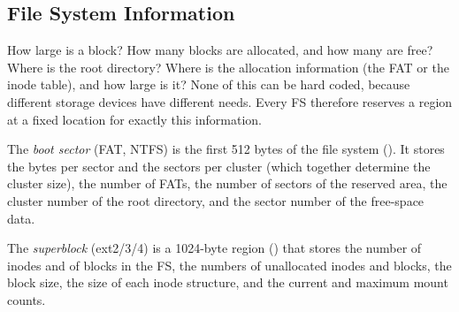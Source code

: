 \subsection{File System Information}

How large is a block? How many blocks are allocated, and how many are free? Where is the root directory? Where is the allocation information (the FAT or the inode table), and how large is it? None of this can be hard coded, because different storage devices have different needs. Every FS therefore reserves a region at a fixed location for exactly this information.

\begin{definition}
  The \emph{boot sector} (FAT, NTFS) is the first 512 bytes of the file system (). It stores the bytes per sector and the sectors per cluster (which together determine the cluster size), the number of FATs, the number of sectors of the reserved area, the cluster number of the root directory, and the sector number of the free-space data.

  The \emph{superblock} (ext2/3/4) is a 1024-byte region () that stores the number of inodes and of blocks in the FS, the numbers of unallocated inodes and blocks, the block size, the size of each inode structure, and the current and maximum mount counts.
\end{definition}

